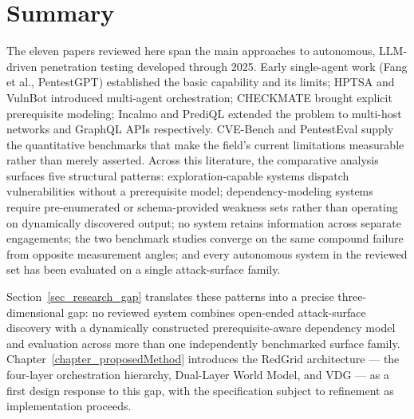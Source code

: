 \section{Summary}
\label{sec_chapter2_summary}

The eleven papers reviewed here span the main approaches to autonomous, LLM-driven penetration testing developed through 2025. Early single-agent work (Fang et al., PentestGPT) established the basic capability and its limits; HPTSA and VulnBot introduced multi-agent orchestration; CHECKMATE brought explicit prerequisite modeling; Incalmo and PrediQL extended the problem to multi-host networks and GraphQL APIs respectively. CVE-Bench and PentestEval supply the quantitative benchmarks that make the field's current limitations measurable rather than merely asserted. Across this literature, the comparative analysis surfaces five structural patterns: exploration-capable systems dispatch vulnerabilities without a prerequisite model; dependency-modeling systems require pre-enumerated or schema-provided weakness sets rather than operating on dynamically discovered output; no system retains information across separate engagements; the two benchmark studies converge on the same compound failure from opposite measurement angles; and every autonomous system in the reviewed set has been evaluated on a single attack-surface family.

Section~\ref{sec_research_gap} translates these patterns into a precise three-dimensional gap: no reviewed system combines open-ended attack-surface discovery with a dynamically constructed prerequisite-aware dependency model and evaluation across more than one independently benchmarked surface family. Chapter~\ref{chapter_proposedMethod} introduces the RedGrid architecture --- the four-layer orchestration hierarchy, Dual-Layer World Model, and VDG --- as a first design response to this gap, with the specification subject to refinement as implementation proceeds.
